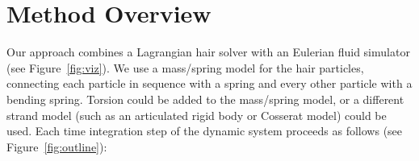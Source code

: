 


\vspace{-2pt}
\section{Method Overview}
\vspace{-4pt}

Our approach combines a Lagrangian hair solver with an Eulerian fluid simulator
(see Figure~\ref{fig:viz}).
We use a mass/spring model for the hair particles, connecting each particle in
sequence with a spring and every other particle with a bending spring.  Torsion
could be added to the mass/spring model, or a different strand model (such as an
articulated rigid body or Cosserat model) could be used. Each time integration step of the
dynamic system proceeds as follows (see Figure~\ref{fig:outline}):


